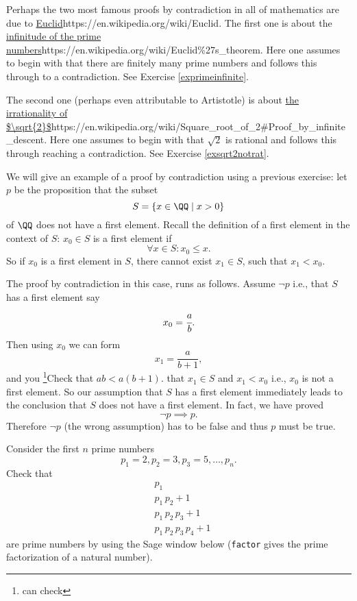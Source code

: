\documentclass{article}
\begin{document}
Perhaps the two most famous proofs by contradiction in all of mathematics are due to \url{Euclid}{https://en.wikipedia.org/wiki/Euclid}. The first one is about the \url{infinitude of the prime
  numbers}{https://en.wikipedia.org/wiki/Euclid\%27s_theorem}.
Here one assumes to begin with that
there are finitely many prime numbers and follows this through to a contradiction.
See Exercise \ref{exprimeinfinite}.




The second
one (perhaps even attributable to Artistotle) is about \url{the irrationality of $\sqrt{2}$}{https://en.wikipedia.org/wiki/Square_root_of_2#Proof_by_infinite_descent}. Here one assumes to begin with
that $\sqrt{2}$ is rational and follows this through reaching a contradiction. See
Exercise \ref{exsqrt2notrat}.


\begin{example}
  We will give an example of a proof by contradiction using a previous exercise: let $p$
  be the proposition that
the subset
$$
S = \{x\in \QQ \mid x > 0\}
$$
of $\QQ$ 
does not have a first element. Recall the definition of a first element in
the context of $S$: $x_0\in S$ is a first element if 
$$
\forall x\in S: x_0 \leq x.
$$
So if $x_0$ is a first element in $S$, there cannot exist $x_1\in S$, such that
$x_1 < x_0$.

The proof by contradiction  in this case, runs as follows. Assume $\neg p$ i.e., that $S$
has a first element say
$$
x_0 = \cfrac{a}{b}.
$$
Then using $x_0$ we can form
$$
x_1 = \frac{a}{b+1},
$$
and you \footnote{can check}{Check that $a b < a(b+1)$.} that $x_1\in S$ and $x_1 < x_0$ i.e., $x_0$ is not a first
element. So our assumption that $S$ has a first element immediately leads
to the conclusion that $S$ does not have a first element. In fact, we have proved
$$
\neg p \implies p.
$$
Therefore $\neg p$ (the wrong assumption)
has to be false and thus $p$ must be true.
\end{example}

\beginshex\label{exprimeinfinite}
Consider the first $n$ prime numbers
$$
p_1 = 2, p_2 = 3, p_3 = 5, \dots, p_n.
$$
Check that
\begin{align*}
  &p_1\\
  &p_1\, p_2 + 1\\
  &p_1\, p_2\, p_3 + 1\\
  &p_1\, p_2\, p_3\, p_4 + 1
\end{align*}
are prime numbers by using the Sage window below (\texttt{factor} gives
the prime factorization of a natural number).
\end{document}
